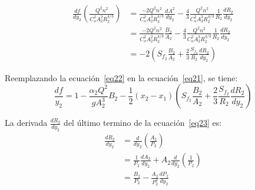 \documentclass[11pt, oneside]{article}
\begin{document}
\begin{equation}
\begin{split}
    \frac{d f}{dy_2}\left( \frac{Q^2 n^2}{C_o^2 A_2^2 R_2^{4/3}} \right) &= \frac{-2 Q^2 n^2}{C_o^2 A_2^3 R_2^{4/3}}\frac{d A^2}{dy_2} - \frac{4}{3}\frac{Q^2 n^2}{C_o^2 A_2^3 R_2^{4/3}}\frac{1}{R_2}\frac{d R_2}{dy_2} \\
                                                                       &= \frac{-2 Q^2 n^2}{C_o^2 A_2^2 R_2^{4/3}}\frac{B_2}{A_2} - \frac{4}{3}\frac{Q^2 n^2}{C_o^2 A_2^3 R_2^{4/3}}\frac{1}{R_2}\frac{d R_2}{dy_2} \\
                                                                       &= -2 \left( S_{f_2}\frac{B_2}{A_2} + \frac{2}{3}\frac{S_{f_2}}{R_2}\frac{d R_2}{dy_2} \right)
\end{split}
\label{eq22}
\end{equation}

Reemplazando la ecuaci\'on~\ref{eq22} en la ecuaci\'on~\ref{eq21}, se tiene:
\begin{equation}
    \frac{df}{y_2} = 1 - \frac{\alpha_2 Q^2}{g A_2^3}B_2 - \frac{1}{2}\left( x_2 - x_1 \right)\left( S_{f_2}\frac{B_2}{A_2} + \frac{2}{3}\frac{S_{f_2}}{R_2}\frac{d R_2}{dy_2} \right)
\label{eq23}
\end{equation}

La derivada $\frac{d R_2}{dy_2}$ del \'ultimo termino de la ecuaci\'on~\ref{eq23} es:
\begin{equation}
\begin{split}
    \frac{d R_2}{d y_2} &= \frac{d}{d y_2} \left( \frac{A_2}{P_2} \right)\\
                        &= \frac{1}{P_2}\frac{d A_2}{d y_2} + A_2 \frac{d}{d y_2}\left( \frac{1}{P_2} \right)\\
                        &= \frac{B_2}{P_2} - \frac{A_2}{P_2^2}\frac{d P_2}{d y_2} 
\end{split}
\label{eq24}
\end{equation}
\end{document}
